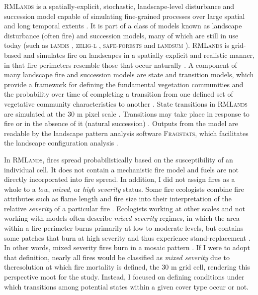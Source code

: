 \textsc{RMLands} is a spatially-explicit, stochastic, landscape-level disturbance and succession model capable of simulating fine-grained processes over large spatial and long temporal extents \citep{McGarigal2005}. It is part of a class of models known as landscape disturbance (often fire) and succession models, many of which are still in use today (such as \textsc{landis} \citep{He1999}, \textsc{zelig-l} \citep{Miller1999}, \textsc{safe-forests} \cite{Sessions1997} and \textsc{landsum} \citep{Keane2012}). \textsc{RMLands} is grid-based and simulates fire on landscapes in a spatially explicit and realistic manner, in that fire perimeters resemble those that occur naturally \citep{McGarigal2005a,McGarigal2005}. A component of many landscape fire and succession models are state and transition models, which provide a framework for defining the fundamental vegetation communities and the probability over time of completing a transition from one defined set of vegetative community characteristics to another \citep{Stringham2003,Blankenship2015}. State transitions in \textsc{RMLands} are simulated at the 30 m pixel scale \citep{Cushman2011}. Transitions may take place in response to fire or in the absence of it (natural succession) \citep{McGarigal2012}. Outputs from the model are readable by the landscape pattern analysis software \textsc{Fragstats}, which facilitates the landscape configuration analysis \citep{Fragstats2012}.

In \textsc{RMLands}, fires spread probabilistically based on the susceptibility of an individual cell. It does not contain a mechanistic fire model and fuels are not directly incorporated into fire spread. In addition, I did not assign fires as a whole to a \emph{low}, \emph{mixed}, or \emph{high severity} status. Some fire ecologists combine fire attributes such as flame length and fire size into their interpretation of the relative \emph{severity} of a particular fire \citep{Agee1993}. Ecologists working at other scales and not working with models often describe \emph{mixed severity} regimes, in which the area within a fire perimeter burns primarily at low to moderate levels, but contains some patches that burn at high severity and thus experience stand-replacement \citep{Collins2010,Kane2013}. In other words, mixed severity fires burn in a mosaic pattern \citep{Beaty2001}. If I were to adopt that definition, nearly all fires would be classified as \emph{mixed severity} due to theresolution at which fire mortality is defined, the 30 m grid cell, rendering this perspective moot for the study. Instead, I focused on defining conditions under which transitions among potential states within a given cover type occur or not. 

